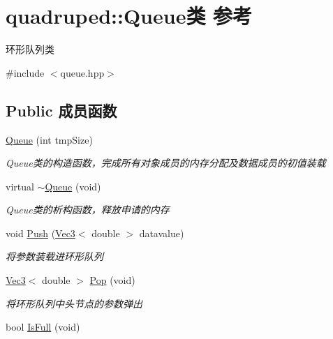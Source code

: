\hypertarget{classquadruped_1_1Queue}{}\section{quadruped\+:\+:Queue类 参考}
\label{classquadruped_1_1Queue}


环形队列类  




{\ttfamily \#include $<$queue.\+hpp$>$}

\subsection*{Public 成员函数}
\begin{DoxyCompactItemize}
\item 
\hyperlink{classquadruped_1_1Queue_a3c4948bf66b448ed65930ff9a853fbcb}{Queue} (int tmp\+Size)
\begin{DoxyCompactList}\small\item\em Queue类的构造函数，完成所有对象成员的内存分配及数据成员的初值装载 \end{DoxyCompactList}\item 
\mbox{\label{classquadruped_1_1Queue_a64360309e233963647c2964353f06504}} 
virtual \hyperlink{classquadruped_1_1Queue_a64360309e233963647c2964353f06504}{$\sim$\+Queue} (void)
\begin{DoxyCompactList}\small\item\em Queue类的析构函数，释放申请的内存 \end{DoxyCompactList}\item 
void \hyperlink{classquadruped_1_1Queue_ac57215a33ba972830ed82cae76d37a19}{Push} (\hyperlink{cppTypes_8h_a65c27bf97693676535dd0b30ea0ad399}{Vec3}$<$ double $>$ datavalue)
\begin{DoxyCompactList}\small\item\em 将参数装载进环形队列 \end{DoxyCompactList}\item 
\hyperlink{cppTypes_8h_a65c27bf97693676535dd0b30ea0ad399}{Vec3}$<$ double $>$ \hyperlink{classquadruped_1_1Queue_a6021646c0fbb5d7f1273a12c91bf5974}{Pop} (void)
\begin{DoxyCompactList}\small\item\em 将环形队列中头节点的参数弹出 \end{DoxyCompactList}\item 
bool \hyperlink{classquadruped_1_1Queue_a5371fc49bf2f44410aed19b17f6f4cc2}{Is\+Full} (void)

\end{DoxyCompactItemize}
